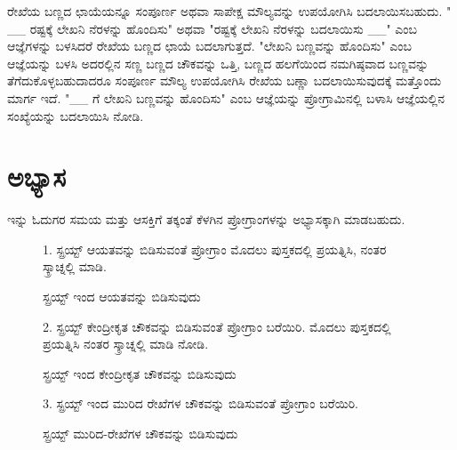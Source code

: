 ರೇಖೆಯ ಬಣ್ಣದ ಛಾಯೆಯನ್ನೂ ಸಂಪೂರ್ಣ ಅಥವಾ ಸಾಪೇಕ್ಷ ಮೌಲ್ಯವನ್ನು ಉಪಯೋಗಿಸಿ ಬದಲಾಯಿಸಬಹುದು.  " \_\_ ರಷ್ಟಕ್ಕೆ ಲೇಖನಿ ನೆರಳನ್ನು ಹೊಂದಿಸು" ಅಥವಾ "ರಷ್ಟಕ್ಕೆ ಲೇಖನಿ ನೆರಳನ್ನು ಬದಲಾಯಿಸು \_\_" ಎಂಬ ಆಜ್ಞೆಗಳನ್ನು ಬಳಸಿದರೆ ರೇಖೆಯ ಬಣ್ಣದ ಛಾಯೆ ಬದಲಾಗುತ್ತದೆ.  "ಲೇಖನಿ ಬಣ್ಣವನ್ನು ಹೊಂದಿಸು" ಎಂಬ ಆಜ್ಞೆಯನ್ನು ಬಳಸಿ ಅದರಲ್ಲಿನ ಸಣ್ಣ ಬಣ್ಣದ ಚೌಕವನ್ನು ಒತ್ತಿ, ಬಣ್ಣದ ಹಲಗೆಯಿಂದ ನಮಗಿಷ್ಠವಾದ ಬಣ್ಣವನ್ನು ತೆಗೆದುಕೊಳ್ಳಬಹುದಾದರೂ ಸಂಪೂರ್ಣ ಮೌಲ್ಯ ಉಪಯೋಗಿಸಿ ರೇಖೆಯ ಬಣ್ಣಾ ಬದಲಾಯಿಸುವುದಕ್ಕೆ ಮತ್ತೊಂದು ಮಾರ್ಗ ಇದೆ.  "\_\_ ಗೆ ಲೇಖನಿ ಬಣ್ಣವನ್ನು ಹೊಂದಿಸು" ಎಂಬ ಆಜ್ಞೆಯನ್ನು ಪ್ರೋಗ್ರಾಮಿನಲ್ಲಿ ಬಳಾಸಿ ಆಜ್ಞೆಯಲ್ಲಿನ ಸಂಖ್ಯೆಯನ್ನು ಬದಲಾಯಿಸಿ ನೋಡಿ. 

\section{ಅಭ್ಯಾಸ }
ಇನ್ನು ಓದುಗರ ಸಮಯ ಮತ್ತು ಆಸಕ್ತಿಗೆ ತಕ್ಕಂತೆ ಕೆಳಗಿನ ಪ್ರೋಗ್ರಾಂಗಳನ್ನು ಅಭ್ಯಾಸಕ್ಕಾಗಿ ಮಾಡಬಹುದು.

\begin{figure}[h]
1. ಸ್ಪ್ರಯ್ಟ್ ಆಯತವನ್ನು ಬಿಡಿಸುವಂತೆ ಪ್ರೋಗ್ರಾಂ ಮೊದಲು ಪುಸ್ತಕದಲ್ಲಿ ಪ್ರಯತ್ನಿಸಿ, ನಂತರ ಸ್ಕ್ರಾಚ್ನಲ್ಲಿ ಮಾಡಿ. 
\begin{center}
\end{center}
\caption{ಸ್ಪ್ರಯ್ಟ್ ಇಂದ  ಆಯತವನ್ನು ಬಿಡಿಸುವುದು}
\label{pen_program1}
\end{figure}

\begin{figure}[h]
2. ಸ್ಪ್ರಯ್ಟ್ ಕೇಂದ್ರೀಕೃತ ಚೌಕವನ್ನು ಬಿಡಿಸುವಂತೆ ಪ್ರೋಗ್ರಾಂ ಬರೆಯಿರಿ. ಮೊದಲು ಪುಸ್ತಕದಲ್ಲಿ ಪ್ರಯತ್ನಿಸಿ ನಂತರ ಸ್ಕ್ರಾಚ್ನಲ್ಲಿ ಮಾಡಿ ನೋಡಿ. 
\begin{center}
\end{center}
\caption{ಸ್ಪ್ರಯ್ಟ್ ಇಂದ ಕೇಂದ್ರೀಕೃತ ಚೌಕವನ್ನು ಬಿಡಿಸುವುದು}
\label{pen_program2}
\end{figure}


\begin{figure}[h]
3. ಸ್ಪ್ರಯ್ಟ್ ಇಂದ ಮುರಿದ ರೇಖೆಗಳ ಚೌಕವನ್ನು ಬಿಡಿಸುವಂತೆ ಪ್ರೋಗ್ರಾಂ ಬರೆಯಿರಿ. \begin{center}
\end{center}
\caption{ಸ್ಪ್ರಯ್ಟ್ ಮುರಿದ-ರೇಖೆಗಳ ಚೌಕವನ್ನು ಬಿಡಿಸುವುದು}
\label{pen_program3}
\end{figure}

